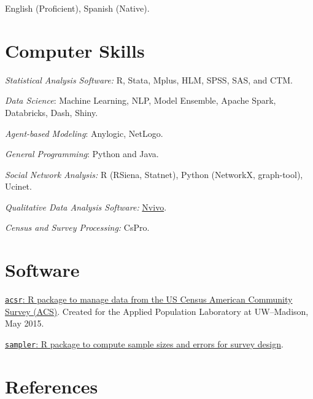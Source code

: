 \documentclass[10pt,letterpaper]{article}
\renewenvironment{itemize}{
  \begin{list}{}{
    \setlength{\leftmargin}{1.5em}
    \setlength{\itemsep}{0.25em}
    \setlength{\parskip}{0pt}
    \setlength{\parsep}{0.25em}
  }
}{
  \end{list}
}
\begin{document}
\begin{itemize}
\item English (Proficient), Spanish (Native).
\end{itemize}

\section*{Computer Skills}

\begin{itemize}
\item \textit{Statistical Analysis Software:} R, Stata, Mplus, HLM, SPSS, SAS, and CTM.
\item \textit{Data Science}: Machine Learning, NLP, Model Ensemble, Apache Spark, Databricks, Dash, Shiny.
\item \textit{Agent-based Modeling}: Anylogic, NetLogo.
\item \textit{General Programming}: Python and Java.
\item \textit{Social Network Analysis:} R (RSiena, Statnet), Python (NetworkX, graph-tool), Ucinet.
\item \textit{Qualitative Data Analysis Software:} \href{http://www.qsrinternational.com/}{Nvivo}.
\item \textit{Census and Survey Processing:} CsPro.
\end{itemize}

\section*{Software}

\begin{itemize}
\item \href{https://github.com/sdaza/acsr}{\texttt{acsr}: R package to manage data from the US Census American Community Survey (ACS)}. Created for the Applied Population Laboratory at UW--Madison, May 2015.
\item \href{https://github.com/sdaza/sampler}{\texttt{sampler}: R package to compute sample sizes and errors for survey design}.
\end{itemize}

\section*{References}
\end{document}
